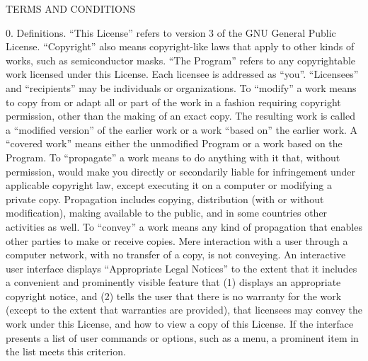 \documentclass {scrbook}
\begin{document}
\begin{tiny}
TERMS AND CONDITIONS

0. Definitions. ``This License'' refers to version 3 of the GNU General Public License. ``Copyright'' also means copyright-like laws that apply to other kinds of works, such as semiconductor masks. ``The Program'' refers to any copyrightable work licensed under this License. Each licensee is addressed as ``you''. ``Licensees'' and ``recipients'' may be individuals or organizations. To ``modify'' a work means to copy from or adapt all or part of the work in a fashion requiring copyright permission, other than the making of an exact copy. The resulting work is called a ``modified version'' of the earlier work or a work ``based on'' the earlier work. A ``covered work'' means either the unmodified Program or a work based on the Program. To ``propagate'' a work means to do anything with it that, without permission, would make you directly or secondarily liable for infringement under applicable copyright law, except executing it on a computer or modifying a private copy. Propagation includes copying, distribution (with or without modification), making available to the public, and in some countries other activities as well. To ``convey'' a work means any kind of propagation that enables other parties to make or receive copies. Mere interaction with a user through a computer network, with no transfer of a copy, is not conveying. An interactive user interface displays ``Appropriate Legal Notices'' to the extent that it includes a convenient and prominently visible feature that (1) displays an appropriate copyright notice, and (2) tells the user that there is no warranty for the work (except to the extent that warranties are provided), that licensees may convey the work under this License, and how to view a copy of this License. If the interface presents a list of user commands or options, such as a menu, a prominent item in the list meets this criterion.


\end{tiny}
\end{document}
